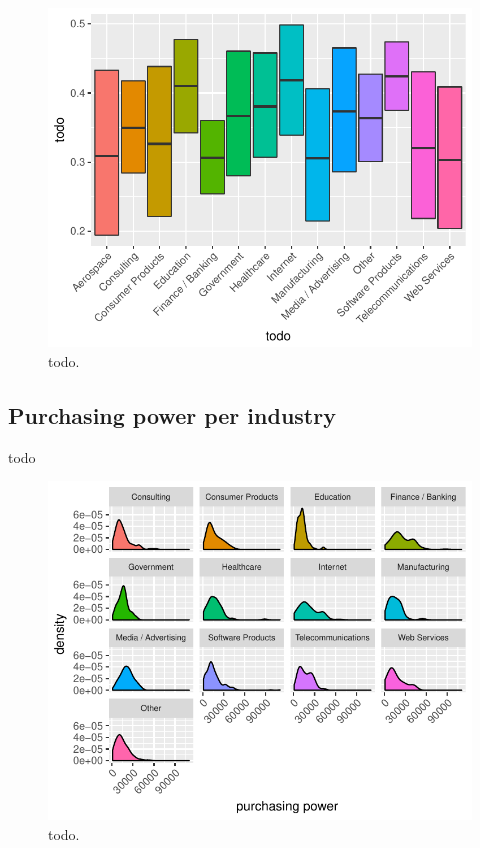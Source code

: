 \documentclass{article}
\begin{document}
\begin{figure}[H]
\centering
\includegraphics{report-038}
\caption{todo.}\label{fig_11}
\end{figure}

\subsection{Purchasing power per industry}
todo


\begin{figure}[H]
\centering
\includegraphics{report-040}
\caption{todo.}\label{fig_12}
\end{figure}
\end{document}
